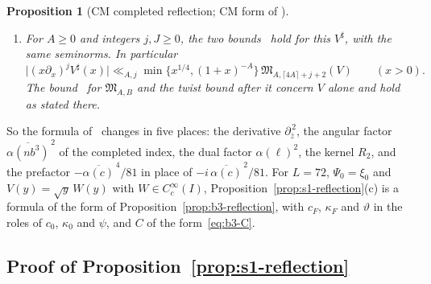 \documentclass[11pt]{article}
\numberwithin{equation}{section}
\newtheorem{proposition}{Proposition}
\begin{document}
\begin{proposition}[CM completed reflection; CM form of {\cite[Prop.~5.1]{OAI78}}]
\begin{enumerate}
 $\overline{\alpha(c)}^{\,4}=\overline{\alpha(c_F)}^{\,4}\prod_{p\ {\rm active}}\overline{\alpha(p)}^{\,4}$.
\item[(e)] For $A\ge0$ and integers $j,J\ge0$, the two bounds~\cite[eqs.~(5.4) and~(5.5)]{OAI78} hold for this $V^\sharp$, with the same seminorms. In particular
 \begin{equation}\label{eq:d128}
  \bigl|(x\partial_x)^jV^\sharp(x)\bigr|\ll_{A,j}\min\{x^{1/4},(1+x)^{-A}\}\,
  \mathfrak M_{A,\lceil4A\rceil+j+2}(V)\qquad(x>0).
 \end{equation}
 The bound~\cite[eq.~(5.6)]{OAI78} for $\mathfrak M_{A,B}$ and the twist bound after it
 concern $V$ alone and hold as stated there.
\end{enumerate}
\end{proposition}

So the formula of~\cite{OAI78} changes in five places: the derivative $\partial_{\bar z}^{\,2}$, the angular
factor $\overline{\alpha(nb^3)}^{\,2}$ of the completed index, the dual factor $\alpha(\ell)^2$, the kernel $R_2$, and
the prefactor $-\overline{\alpha(c)}^{\,4}/81$ in place of $-i\,\overline{\alpha(c)}^{\,2}/81$. For $L=72$,
$\Psi_0=\xi_0$ and $V(y)=\sqrt y\,W(y)$ with $W\in C_c^\infty(I)$, Proposition~\ref{prop:s1-reflection}(c) is
a formula of the form of Proposition~\ref{prop:b3-reflection}, with $c_F$, $\kappa_F$ and $\vartheta$ in the roles of
$c_0$, $\kappa_0$ and $\psi$, and $C$ of the form~\eqref{eq:b3-C}.

\subsection{Proof of Proposition~\ref{prop:s1-reflection}}\label{sec:s1-proof}
\end{document}
